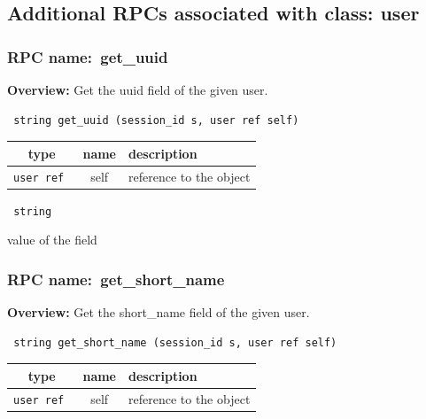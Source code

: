 \subsection{Additional RPCs associated with class: user}
\subsubsection{RPC name:~get\_uuid}

{\bf Overview:} 
Get the uuid field of the given user.

\begin{verbatim} string get_uuid (session_id s, user ref self)\end{verbatim}



 
\vspace{0.3cm}
\begin{tabular}{|c|c|p{7cm}|}
 \hline
{\bf type} & {\bf name} & {\bf description} \\ \hline
{\tt user ref } & self & reference to the object \\ \hline 

\end{tabular}

\vspace{0.3cm}

{\tt 
string
}


value of the field
\vspace{0.3cm}
\vspace{0.3cm}
\vspace{0.3cm}
\subsubsection{RPC name:~get\_short\_name}

{\bf Overview:} 
Get the short\_name field of the given user.

\begin{verbatim} string get_short_name (session_id s, user ref self)\end{verbatim}



 
\vspace{0.3cm}
\begin{tabular}{|c|c|p{7cm}|}
 \hline
{\bf type} & {\bf name} & {\bf description} \\ \hline
{\tt user ref } & self & reference to the object \\ \hline 

\end{tabular}

